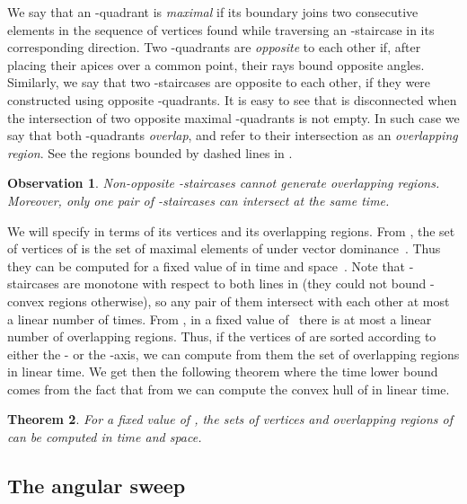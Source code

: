 \documentclass[11pt,letterpaper,english]{article}
\newtheorem{theorem}{Theorem}
\newtheorem{obs}[theorem]{Observation}
\theoremstyle{definition}
\begin{document}
We say that an -quadrant is \emph{maximal} if its boundary
joins two consecutive elements in the sequence of vertices found
while traversing an -staircase in its corresponding
direction. Two -quadrants are \emph{opposite} to each other if,
after placing their apices over a common point, their rays bound
opposite angles. Similarly, we say that two -staircases are
opposite to each other, if they were constructed using opposite
-quadrants. It is easy to see that  is disconnected
when the intersection of two opposite maximal -quadrants is not
empty. In such case we say that both -quadrants \emph{overlap},
and refer to their intersection as an \emph{overlapping region}. See
the regions bounded by dashed lines in
.

\begin{obs}\label{bhull:obs:staircases}
  Non-opposite -staircases cannot generate overlapping
  regions. Moreover, only one pair of -staircases can intersect
  at the same time.
\end{obs}

We will specify  in terms of its vertices and its overlapping
regions. From , the set of vertices of
 is the set of maximal elements of  under vector
dominance~\cite{theta-maxima_1999}. Thus they can be computed for a
fixed value of  in  time and 
space~\cite{kung_1975,preparata_1985}. Note that -staircases
are monotone with respect to both lines in  (they could not
bound -convex regions otherwise), so any pair of them intersect
with each other at most a linear number of times. From
, in a fixed value of~ there is at
most a linear number of overlapping regions. Thus, if the vertices of
 are sorted according to either the - or the -axis, we
can compute from them the set of overlapping regions in linear
time. We get then the following theorem where the 
time lower bound comes from the fact that from  we can compute
the convex hull of  in linear time.

\begin{theorem}\label{intro:thm:fixed_computation}
  For a fixed value of , the sets of vertices and overlapping
  regions of  can be computed in  time and
   space.
\end{theorem}

\subsection{The angular sweep}\label{sec:bhull:sweep}
\end{document}
